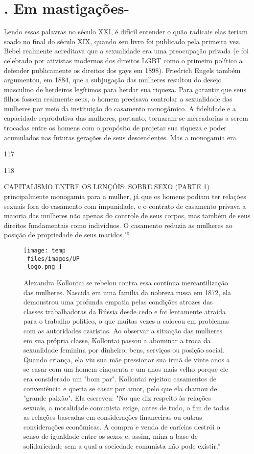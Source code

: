 \section{. Em mastigações-}
 \par 
Lendo essas palavras no século XXI, é difícil entender o quão radicais elas teriam soado no final do século XIX, quando seu livro foi publicado pela primeira vez. Bebel realmente acreditava que a sexualidade era uma preocupação privada (e foi celebrado por ativistas modernos dos direitos LGBT como o primeiro político a defender publicamente os direitos dos gays em 1898). Friedrich Engels também argumentou, em 1884, que a subjugação das mulheres resultou do desejo masculino de herdeiros legítimos para herdar sua riqueza. Para garantir que seus filhos fossem realmente seus, o homem precisava controlar a sexualidade das mulheres por meio da instituição do casamento monogâmico. A fidelidade e a capacidade reprodutiva das mulheres, portanto, tornaram-se mercadorias a serem trocadas entre os homens com o propósito de projetar sua riqueza e poder acumulados nas futuras gerações de seus descendentes. Mas a monogamia era
 \par 
117
 \par 
118
 \par 
CAPITALISMO ENTRE OS LENÇÓIS: SOBRE SEXO (PARTE {\color{blue}1}) principalmente monogamia para a mulher, já que os homens podiam ter relações sexuais fora do casamento com impunidade, e o contrato de casamento privava a maioria das mulheres não apenas do controle de seus corpos, mas também de seus direitos fundamentais como indivíduos. O casamento reduzia as mulheres ao posição de propriedade de seus maridos."°
 \par 
\begin{figure}
	\centering
	\texttt{[image: temp\\\_files/images/UP\\\_logo.png ]}
	\caption{Alexandra Kollontai se rebelou contra essa contínua mercantilização das mulheres. Nascida em uma família da nobreza russa em 1872, ela demonstrou uma profunda empatia pelas condições atrozes das classes trabalhadoras da Rússia desde cedo e foi lentamente atraída para o trabalho político, o que muitas vezes a colocou em problemas com as autoridades czaristas. Ao observar a situação das mulheres em sua própria classe, Kollontai passou a abominar a troca da sexualidade feminina por dinheiro, bens, serviços ou posição social. Quando criança, ela viu sua mãe pressionar sua irmã de vinte anos a se casar com um homem cinquenta e um anos mais velho porque ele era considerado um "bom par". Kollontai rejeitou casamentos de conveniência e queria se casar por amor, pelo que ela chamou de "grande paixão". Ela escreveu: "No que diz respeito às relações sexuais, a moralidade comunista exige, antes de tudo, o fim de todas as relações baseadas em considerações financeiras ou outras considerações econômicas. A compra e venda de carícias destrói o senso de igualdade entre os sexos e, assim, mina a base de solidariedade sem a qual a sociedade comunista não pode existir.”}
	\label{ }
\end{figure}
